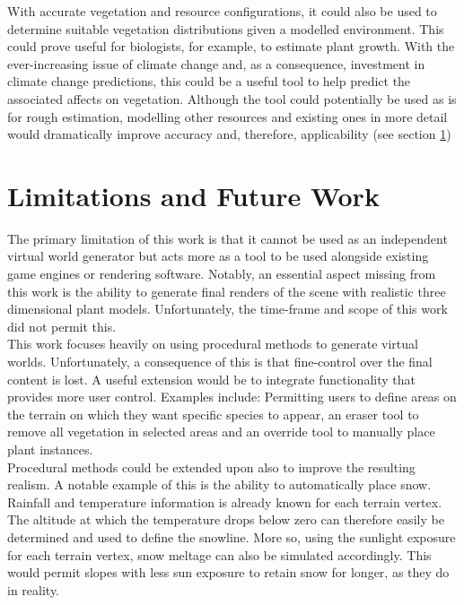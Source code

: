 With accurate vegetation and resource configurations, it could also be used to determine suitable vegetation distributions given a modelled environment. This could prove useful for biologists, for example, to estimate plant growth. With the ever-increasing issue of climate change and, as a consequence, investment in climate change predictions, this could be a useful tool to help predict the associated affects on vegetation. Although the tool could potentially be used as is for rough estimation, modelling other resources and existing ones in more detail would dramatically improve accuracy and, therefore, applicability (see section \ref{sec:future_work})\\

\section{Limitations and Future Work} \label{sec:future_work}

The primary limitation of this work is that it cannot be used as an independent virtual world generator but acts more as a tool to be used alongside existing game engines or rendering software. Notably, an essential aspect missing from this work is the ability to generate final renders of the scene with realistic three dimensional plant models. Unfortunately, the time-frame and scope of this work did not permit this.\\

This work focuses heavily on using procedural methods to generate virtual worlds. Unfortunately, a consequence of this is that fine-control over the final content is lost. A useful extension would be to integrate functionality that provides more user control. Examples include: Permitting users to define areas on the terrain on which they want specific species to appear, an eraser tool to remove all vegetation in selected areas and an override tool to manually place plant instances.\\

Procedural methods could be extended upon also to improve the resulting realism. A notable example of this is the ability to automatically place snow. Rainfall and temperature information is already known for each terrain vertex. The altitude at which the temperature drops below zero can therefore easily be determined and used to define the snowline. More so, using the sunlight exposure for each terrain vertex, snow meltage can also be simulated accordingly. This would permit slopes with less sun exposure to retain snow for longer, as they do in reality. \\

